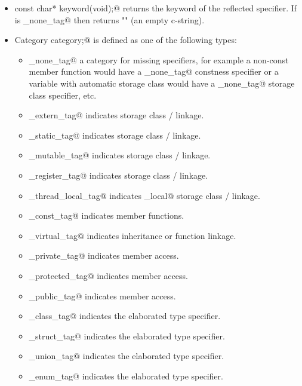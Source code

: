 \begin{itemize}

\item{\verb@static const char* keyword(void);@} returns the keyword
of the reflected specifier. If \verb@category@ is \verb@spec_none_tag@
then \verb@keyword@ returns "" (an empty c-string).

\item{\verb@typedef Category category;@} is defined as one of the following 
types:
	\begin{itemize}
		\item{\verb@spec_none_tag@} a category for missing specifiers,
		for example a non-const member function would have a \verb@spec_none_tag@
		constness specifier or a variable with automatic storage class
		would have a \verb@spec_none_tag@ storage class specifier, etc.

		\item{\verb@spec_extern_tag@} indicates \verb@extern@ storage class / linkage.
		\item{\verb@spec_static_tag@} indicates \verb@static@ storage class / linkage.
		\item{\verb@spec_mutable_tag@} indicates \verb@mutable@ storage class / linkage.
		\item{\verb@spec_register_tag@} indicates \verb@register@ storage class / linkage.
		\item{\verb@spec_thread_local_tag@} indicates \verb@thread_local@ storage class / linkage.

		\item{\verb@spec_const_tag@} indicates \verb@const@ member functions.

		\item{\verb@spec_virtual_tag@} indicates \verb@virtual@ inheritance or function linkage.

		\item{\verb@spec_private_tag@} indicates \verb@private@ member access.
		\item{\verb@spec_protected_tag@} indicates \verb@protected@ member access.
		\item{\verb@spec_public_tag@} indicates \verb@public@ member access.

		\item{\verb@spec_class_tag@} indicates the \verb@class@ elaborated type specifier.
		\item{\verb@spec_struct_tag@} indicates the \verb@struct@ elaborated type specifier.
		\item{\verb@spec_union_tag@} indicates the \verb@union@ elaborated type specifier.
		\item{\verb@spec_enum_tag@} indicates the \verb@enum@ elaborated type specifier.
	\end{itemize}
\end{itemize}

